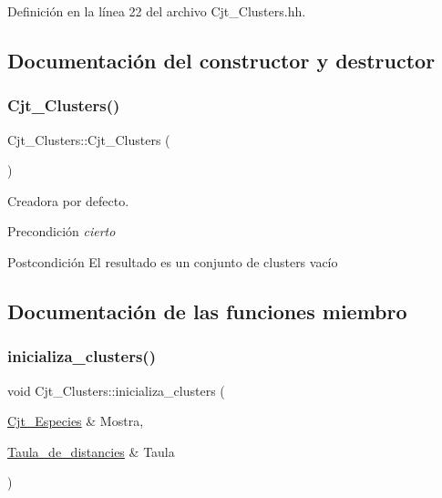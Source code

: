 Definición en la línea 22 del archivo Cjt\+\_\+\+Clusters.\+hh.



\subsection{Documentación del constructor y destructor}
\mbox{\label{class_cjt___clusters_a2e55759944a78043744103e19dd87c1c}} 
\subsubsection{\texorpdfstring{Cjt\+\_\+\+Clusters()}{Cjt\_Clusters()}}
{\footnotesize\ttfamily Cjt\+\_\+\+Clusters\+::\+Cjt\+\_\+\+Clusters (\begin{DoxyParamCaption}{ }\end{DoxyParamCaption})}



Creadora por defecto. 

\begin{DoxyPrecond}{Precondición}
{\itshape cierto} 
\end{DoxyPrecond}
\begin{DoxyPostcond}{Postcondición}
El resultado es un conjunto de clusters vacío 
\end{DoxyPostcond}


\subsection{Documentación de las funciones miembro}
\mbox{\label{class_cjt___clusters_a7dec4a423a1dbcf6d0351e00dd653eee}} 
\subsubsection{\texorpdfstring{inicializa\+\_\+clusters()}{inicializa\_clusters()}}
{\footnotesize\ttfamily void Cjt\+\_\+\+Clusters\+::inicializa\+\_\+clusters (\begin{DoxyParamCaption}\item[{\hyperlink{class_cjt___especies}{Cjt\+\_\+\+Especies} \&}]{Mostra,  }\item[{\hyperlink{class_taula__de__distancies}{Taula\+\_\+de\+\_\+distancies} \&}]{Taula }\end{DoxyParamCaption})}



